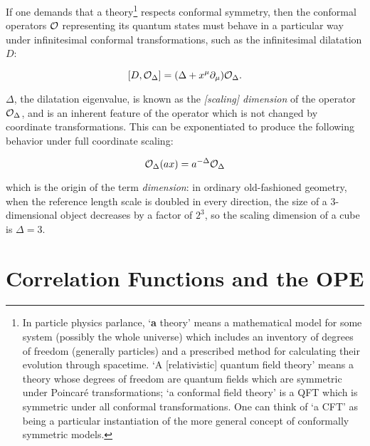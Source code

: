 If one demands that a theory\footnote{In particle physics parlance, `\textbf{a} 
theory' means a mathematical model for some system (possibly the whole universe)
which includes an inventory of degrees of freedom (generally particles) and a 
prescribed method for calculating their evolution through spacetime. `A 
[relativistic] quantum field theory' means a theory whose degrees of freedom are
quantum fields which are symmetric under Poincar\'e transformations; `a 
conformal field theory' is a QFT which is symmetric under all conformal 
transformations. One can think of `a CFT' as being a particular instantiation of
the more general concept of conformally symmetric models.} respects conformal
symmetry, then the conformal operators ${\cal O}$ representing its quantum 
states must behave in a particular way under infinitesimal conformal 
transformations, such as the infinitesimal dilatation $D$:

\begin{equation}
    \left[ D, {\cal O}_\Delta \right] 
    = (\Delta + x^\mu \partial_\mu) {\cal O}_\Delta.
\end{equation}

$\Delta$, the dilatation eigenvalue, is known as the \emph{[scaling] dimension}
of the operator ${\cal O}_\Delta$, and is an inherent feature of the operator
which is not changed by coordinate transformations. This can be exponentiated to
produce the following behavior under full coordinate scaling:

\begin{equation}
    {\cal O}_\Delta (a x) = a^{-\Delta} {\cal O}_\Delta
\end{equation}

which is the origin of the term \emph{dimension}: in ordinary old-fashioned 
geometry, when the reference length scale is doubled in every direction, the 
size of a 3-dimensional object decreases by a factor of $2^3$, so the scaling 
dimension of a cube is $\Delta = 3$.

\section{Correlation Functions and the OPE}
\label{sec:correlators}

